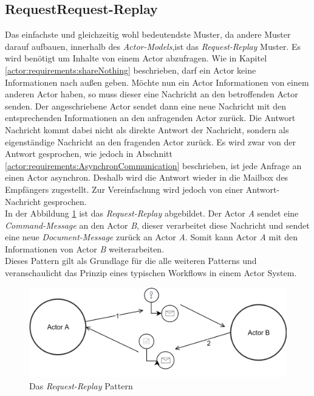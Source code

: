 \subsection{RequestRequest-Replay} 
Das einfachste und gleichzeitig wohl bedeutendste Muster, da andere Muster darauf aufbauen, innerhalb des \textit{Actor-Models},ist das \textit{Request-Replay} Muster. Es wird benötigt um Inhalte von einem Actor abzufragen. Wie in Kapitel \ref{actor:requirements:shareNothing} beschrieben, darf ein Actor keine Informationen nach außen geben. Möchte nun ein Actor Informationen von einem anderen Actor haben, so muss dieser eine Nachricht an den betroffenden Actor senden. Der angeschriebene Actor sendet dann eine neue Nachricht mit den entsprechenden Informationen an den anfragenden Actor zurück. Die Antwort Nachricht kommt dabei nicht als direkte Antwort der Nachricht, sondern als eigenständige Nachricht an den fragenden Actor zurück. Es wird zwar von der Antwort gesprochen, wie jedoch in Abschnitt \ref{actor:requirements:AsynchronCommunication} beschrieben, ist jede Anfrage an einen Actor asynchron. Deshalb wird die Antwort wieder in die Mailbox des Empfängers zugestellt. Zur Vereinfachung wird jedoch von einer Antwort-Nachricht gesprochen. \\
In der Abbildung \ref{fig:actor:patterns:requestReplay} ist das \textit{Request-Replay} abgebildet. Der Actor \textit{A} sendet eine \textit{Command-Message} an den Actor \textit{B}, dieser verarbeitet diese Nachricht und sendet eine neue \textit{Document-Message} zurück an Actor \textit{A}. Somit kann Actor \textit{A} mit den Informationen von Actor \textit{B} weiterarbeiten. \\
Dieses Pattern gilt als Grundlage für die alle weiteren Patterns und veranschaulicht das Prinzip eines typischen Workflows in einem Actor System. \citep{Vernon2015ReactiveAkka}
\begin{figure}
  \centering
  \includegraphics[width=\linewidth]{gfx/actor/patterns/requestReplay}
  \caption{Das \textit{Request-Replay} Pattern}
  \label{fig:actor:patterns:requestReplay}
\end{figure}

